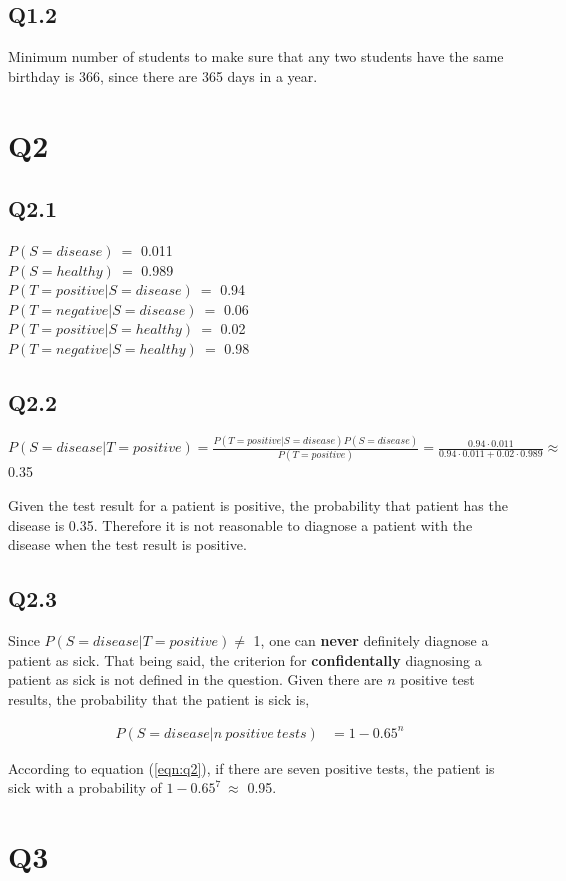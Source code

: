 \documentclass[12pt]{report}
\begin{document}
\subsection*{Q1.2}
Minimum number of students to make sure that any two students have the same birthday is 366, since there are 365 days in a year.

\section*{Q2}


\subsection*{Q2.1}

$P(S=disease)~=$ 0.011 \\
$P(S=healthy)~=$ 0.989 \\
$P(T=positive|S=disease)~=$ 0.94 \\
$P(T=negative|S=disease)~=$ 0.06 \\
$P(T=positive|S=healthy)~=$ 0.02 \\
$P(T=negative|S=healthy)~=$ 0.98 

\subsection*{Q2.2}

$P(S=disease|T=positive)=\frac{P(T=positive|S=disease) P(S=disease)}{P(T=positive)}=\frac{0.94 \cdot 0.011}{0.94 \cdot 0.011 + 0.02 \cdot 0.989} \approx$ 0.35

Given the test result for a patient is positive, the probability that patient has the disease is 0.35. Therefore it is not reasonable to diagnose a patient with the disease when the test result is positive.

\subsection*{Q2.3}

Since $P(S=disease|T=positive) \neq$ 1, one can \textbf{never} definitely diagnose a patient as sick. That being said, the criterion for \textbf{confidentally} diagnosing a patient as sick is not defined in the question. Given there are $n$ positive test results, the probability that the patient is sick is,

\begin{align} \label{eqn:q2}
P(S=disease|n~positive~tests) &= 1 - 0.65^n
\end{align}

According to equation (\ref{eqn:q2}), if there are seven positive tests, the patient is sick with a probability of $1 - 0.65^7~\approx$ 0.95.

\section*{Q3}
\end{document}
